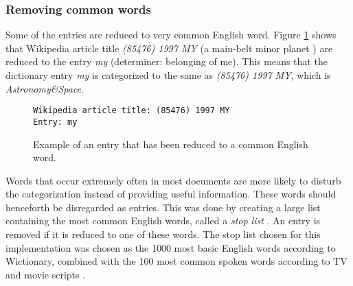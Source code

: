 
\subsubsection{Removing common words}
Some of the entries are reduced to very common English word. Figure \ref{fig:common_word} shows that Wikipedia article title \emph{(85476) 1997 MY} (a main-belt minor planet \cite{wiki:myplanet}) are reduced to the entry \emph{my} (determiner: belonging of me). This means that the dictionary entry \emph{my} is categorized to the same as \emph{(85476) 1997 MY}, which is \emph{Astronomy\&Space}.


\begin{figure}[h]
\centering
\begin{lstlisting}
Wikipedia article title: (85476) 1997 MY
Entry: my
\end{lstlisting}
\caption[Entry reduced to common English word]{Example of an entry that has been reduced to a common English word. }
\label{fig:common_word}
\end{figure}

Words that occur extremely often in most documents are more likely to disturb the categorization instead of providing useful information. These words should henceforth be disregarded as entries. This was done by creating a large list containing the most common English words, called a \emph{stop list} \cite[p.~ 25][]{iirbook} . An entry is removed if it is reduced to one of these words. The stop list chosen for this implementation was chosen as the 1000 most basic English words according to Wictionary, combined with the 100 most common spoken words according to TV and movie scripts \cite{wiki:freqwordlist}.

